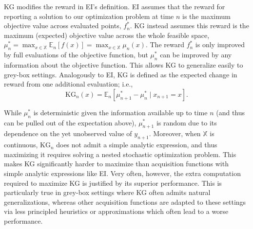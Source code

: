 \documentclass{wscpaperproc}
\newcommand{\E}{\mathbb{E}}
\newcommand{\X}{\mathbb{X}}
\newcommand{\KG}{\mathrm{KG}}
\theoremstyle{wsc}
\begin{document}
KG modifies the reward in EI's definition.
EI assumes that the reward for reporting a solution to our optimization problem at time $n$ is the maximum objective value across evaluated points, $f^*_n$. 
KG instead assumes this reward is the maximum (expected) objective value across the whole feasible space, $\mu_n^* = \max_{x\in\X}\E_n[f(x)]=    \max_{x\in\X}\mu_n(x)$. The reward $f^*_{n}$ is only improved by full evaluations of the objective function, but $\mu^*_n$ can be improved by any information about the objective function. This allows KG to generalize easily to grey-box settings. Analogously to EI, KG is defined as the expected change in reward from one additional evaluation; i.e., 
\begin{equation*}
    \KG_n(x) = \E_n[\mu_{n+1}^* - \mu_n^* \mid x_{n+1}=x].
\end{equation*}


While $\mu_n^*$ is deterministic given the information available up to time $n$ (and thus can be pulled out of the expectation above), $\mu_{n+1}^*$ is random due to its dependence on the yet unobserved value of $y_{n+1}$. 
Moreover, when $\X$ is continuous, $\KG_n$ does not admit a simple analytic expression, and thus maximizing it requires solving a nested stochastic optimization problem. This makes KG significantly harder to maximize than acquisition functions with simple analytic expressions like EI. Very often, however, the extra computation required to maximize KG is justified by its superior performance. This is particularly true in grey-box settings where KG often admits natural generalizations, whereas other acquisition functions are adapted to these settings via less principled heuristics or approximations which often lead to a worse performance.
\end{document}
